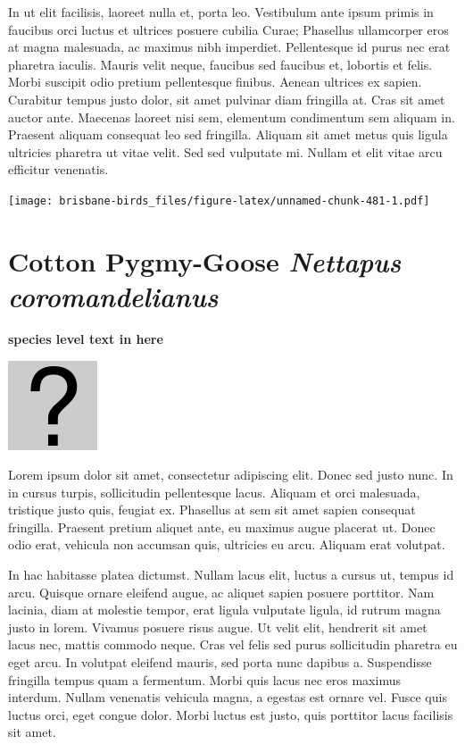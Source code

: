 \documentclass[]{book}
\let\origfigure\figure
\let\endorigfigure\endfigure
\renewenvironment{figure}[1][2] {
  \expandafter\origfigure\expandafter[H]
} {
  \endorigfigure
}
\begin{document}
In ut elit facilisis, laoreet nulla et, porta leo. Vestibulum ante ipsum
primis in faucibus orci luctus et ultrices posuere cubilia Curae;
Phasellus ullamcorper eros at magna malesuada, ac maximus nibh
imperdiet. Pellentesque id purus nec erat pharetra iaculis. Mauris velit
neque, faucibus sed faucibus et, lobortis et felis. Morbi suscipit odio
pretium pellentesque finibus. Aenean ultrices ex sapien. Curabitur
tempus justo dolor, sit amet pulvinar diam fringilla at. Cras sit amet
auctor ante. Maecenas laoreet nisi sem, elementum condimentum sem
aliquam in. Praesent aliquam consequat leo sed fringilla. Aliquam sit
amet metus quis ligula ultricies pharetra ut vitae velit. Sed sed
vulputate mi. Nullam et elit vitae arcu efficitur venenatis.

\begin{figure}
\centering
\texttt{[image: brisbane-birds\_files/figure-latex/unnamed-chunk-481-1.pdf]}
\caption{\label{fig:unnamed-chunk-481}insert figure caption}
\end{figure}

\section{\texorpdfstring{Cotton Pygmy-Goose \emph{Nettapus
coromandelianus}}{Cotton Pygmy-Goose Nettapus coromandelianus}}\label{cotton-pygmy-goose-nettapus-coromandelianus}

\textbf{species level text in here}

\begin{figure}
\centering
\includegraphics{assets/missing.png}
\caption{No image for species}
\end{figure}

Lorem ipsum dolor sit amet, consectetur adipiscing elit. Donec sed justo
nunc. In in cursus turpis, sollicitudin pellentesque lacus. Aliquam et
orci malesuada, tristique justo quis, feugiat ex. Phasellus at sem sit
amet sapien consequat fringilla. Praesent pretium aliquet ante, eu
maximus augue placerat ut. Donec odio erat, vehicula non accumsan quis,
ultricies eu arcu. Aliquam erat volutpat.

In hac habitasse platea dictumst. Nullam lacus elit, luctus a cursus ut,
tempus id arcu. Quisque ornare eleifend augue, ac aliquet sapien posuere
porttitor. Nam lacinia, diam at molestie tempor, erat ligula vulputate
ligula, id rutrum magna justo in lorem. Vivamus posuere risus augue. Ut
velit elit, hendrerit sit amet lacus nec, mattis commodo neque. Cras vel
felis sed purus sollicitudin pharetra eu eget arcu. In volutpat eleifend
mauris, sed porta nunc dapibus a. Suspendisse fringilla tempus quam a
fermentum. Morbi quis lacus nec eros maximus interdum. Nullam venenatis
vehicula magna, a egestas est ornare vel. Fusce quis luctus orci, eget
congue dolor. Morbi luctus est justo, quis porttitor lacus facilisis sit
amet.
\end{document}
